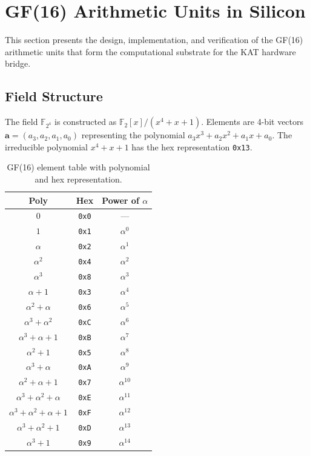 \section{GF(16) Arithmetic Units in Silicon}
\label{sec:hwbridge:gf16}

This section presents the design, implementation, and verification of the
GF(16) arithmetic units that form the computational substrate for the KAT
hardware bridge.

\subsection{Field Structure}

The field $\mathbb{F}_{2^4}$ is constructed as $\mathbb{F}_2[x] / (x^4 + x + 1)$.
Elements are 4-bit vectors $\mathbf{a} = (a_3, a_2, a_1, a_0)$ representing
the polynomial $a_3 x^3 + a_2 x^2 + a_1 x + a_0$. The irreducible polynomial
$x^4 + x + 1$ has the hex representation \texttt{0x13}.

\begin{table}[h]
\centering
\caption{GF(16) element table with polynomial and hex representation.}
\label{tab:hwbridge:gf16-table}
\begin{tabular}{ccc}
\toprule
\textbf{Poly} & \textbf{Hex} & \textbf{Power of $\alpha$} \\
\midrule
$0$         & \texttt{0x0} & --- \\
$1$         & \texttt{0x1} & $\alpha^0$ \\
$\alpha$    & \texttt{0x2} & $\alpha^1$ \\
$\alpha^2$  & \texttt{0x4} & $\alpha^2$ \\
$\alpha^3$  & \texttt{0x8} & $\alpha^3$ \\
$\alpha+1$  & \texttt{0x3} & $\alpha^4$ \\
$\alpha^2+\alpha$ & \texttt{0x6} & $\alpha^5$ \\
$\alpha^3+\alpha^2$ & \texttt{0xC} & $\alpha^6$ \\
$\alpha^3+\alpha+1$ & \texttt{0xB} & $\alpha^7$ \\
$\alpha^2+1$ & \texttt{0x5} & $\alpha^8$ \\
$\alpha^3+\alpha$ & \texttt{0xA} & $\alpha^9$ \\
$\alpha^2+\alpha+1$ & \texttt{0x7} & $\alpha^{10}$ \\
$\alpha^3+\alpha^2+\alpha$ & \texttt{0xE} & $\alpha^{11}$ \\
$\alpha^3+\alpha^2+\alpha+1$ & \texttt{0xF} & $\alpha^{12}$ \\
$\alpha^3+\alpha^2+1$ & \texttt{0xD} & $\alpha^{13}$ \\
$\alpha^3+1$ & \texttt{0x9} & $\alpha^{14}$ \\
\bottomrule
\end{tabular}
\end{table}

